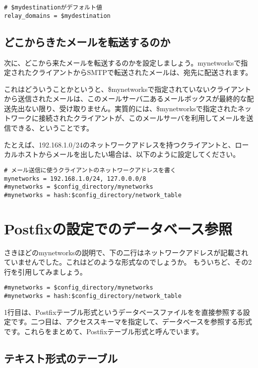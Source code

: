 \begin{lstlisting}[basicstyle=\ttfamily\footnotesize, frame=single]
# $mydestinationがデフォルト値
relay_domains = $mydestination
\end{lstlisting}


\subsection{どこからきたメールを転送するのか}
次に、どこから来たメールを転送するのかを設定しましょう。mynetworksで指定されたクライアントからSMTPで転送されたメールは、宛先に配送されます。

これはどういうことかというと、\$mynetworksで指定されていないクライアントから送信されたメールは、このメールサーバ二あるメールボックスが最終的な配送先出ない限り、受け取りません。実質的には、\$mynetworksで指定されたネットワークに接続されたクライアントが、このメールサーバを利用してメールを送信できる、ということです。

たとえば、192.168.1.0/24のネットワークアドレスを持つクライアントと、ローカルホストからメールを出したい場合は、以下のように設定してください。

\begin{lstlisting}[basicstyle=\ttfamily\footnotesize, frame=single]
# メール送信に使うクライアントのネットワークアドレスを書く
mynetworks = 192.168.1.0/24, 127.0.0.0/8
#mynetworks = $config_directory/mynetworks
#mynetworks = hash:$config_directory/network_table
\end{lstlisting}

\section{Postfixの設定でのデータベース参照}
さきほどのmynetworksの説明で、下の二行はネットワークアドレスが記載されていませんでした。これはどのような形式なのでしょうか。
もういちど、その2行を引用してみましょう。

\begin{lstlisting}[basicstyle=\ttfamily\footnotesize, frame=single]
#mynetworks = $config_directory/mynetworks
#mynetworks = hash:$config_directory/network_table
\end{lstlisting}

1行目は、Postfixテーブル形式というデータベースファイルをを直接参照する設定です。二つ目は、アクセススキーマを指定して、データベースを参照する形式です。これらをまとめて、Postfixテーブル形式と呼んでいます。

\subsection{テキスト形式のテーブル}

